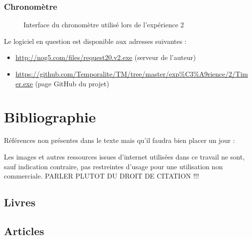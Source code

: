 \documentclass[12pt,fleqn,oneside,french,openany]{book} %
\begin{document}
\subsection*{Chronomètre} \label{sec:chrono}
\begin{figure}[htp] 
	\caption{Interface du chronomètre utilisé lors de l'expérience 2}
\end{figure}
Le logiciel en question est disponible aux adresses suivantes :
\begin{itemize}
\item \url{http://nog5.com/files/request20.v2.exe} (serveur de l'auteur)
\item \url{https://github.com/Temporalite/TM/tree/master/exp%C3%A9rience/2/Timer.exe} (page GitHub du projet)
\end{itemize}



\chapter{Bibliographie}
Références non présentes dans le texte mais qu'il faudra bien placer un jour : \cite{vidnul} \cite{vidcool} \cite{imgheader1} \cite{imgheader2} \cite{imgheader3} \cite{imgheader4} \cite{imgheader5} \cite{analysedonnees}

\begin{remark}
	Les images et autres ressources issues d'internet utilisées dans ce travail ne sont, sauf indication contraire, pas restreintes d'usage pour une utilisation non commerciale. PARLER PLUTOT DU DROIT DE CITATION !!!
\end{remark}

\section*{Livres}
\printbibliography[heading=bibempty,type=book]
\section*{Articles}
\printbibliography[heading=bibempty,type=article]
\end{document}
